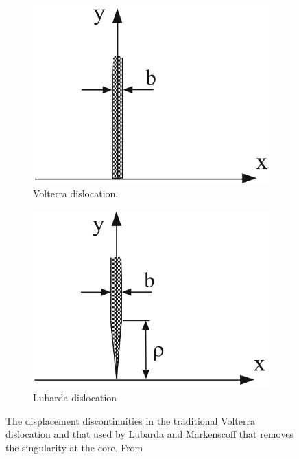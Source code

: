 \begin{figure}
\centering
\begin{subfigure}{0.4\textwidth}
\centering
\includegraphics[width=0.75\linewidth]{Dislocation_with_discontinuity}
\caption{Volterra dislocation.\label{fig:disloc_discontinuity}}
\end{subfigure}%
\begin{subfigure}{0.4\textwidth}
\centering
\includegraphics[width=0.75\linewidth]{Dislocation_without_discontinuity}
\caption{Lubarda dislocation\label{fig:disloc_no_discontinuity}}
\end{subfigure}
\caption{The displacement discontinuities in the traditional Volterra dislocation and that used by Lubarda and Markenscoff that removes the singularity at the core. From \cite{Lubarda2007}\label{fig:discontinuity}}
\end{figure}

